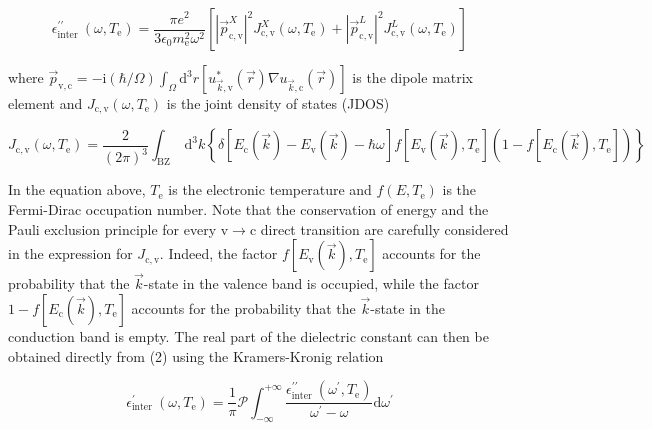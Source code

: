 \documentclass[10pt]{article}
\begin{document}
\begin{equation*}
\epsilon_{\text {inter }}^{\prime \prime}\left(\omega, T_{\mathrm{e}}\right)=\frac{\pi e^{2}}{3 \epsilon_{0} m_{\mathrm{e}}^{2} \omega^{2}}\left[\left|\vec{p}_{\mathrm{c}, \mathrm{v}}^{X}\right|^{2} J_{\mathrm{c}, \mathrm{v}}^{X}\left(\omega, T_{\mathrm{e}}\right)+\left|\vec{p}_{\mathrm{c}, \mathrm{v}}^{L}\right|^{2} J_{\mathrm{c}, \mathrm{v}}^{L}\left(\omega, T_{\mathrm{e}}\right)\right] \tag{2}
\end{equation*}


where $\vec{p}_{\mathrm{v}, \mathrm{c}}=-\mathrm{i}(\hbar / \Omega) \int_{\Omega} \mathrm{d}^{3} r\left[u_{\vec{k}, \mathrm{v}}^{*}(\vec{r}) \nabla u_{\vec{k}, \mathrm{c}}(\vec{r})\right]$ is the dipole matrix element and $J_{\mathrm{c}, \mathrm{v}}\left(\omega, T_{\mathrm{e}}\right)$ is the joint density of states (JDOS)


\begin{equation*}
J_{\mathrm{c}, \mathrm{v}}\left(\omega, T_{\mathrm{e}}\right)=\frac{2}{(2 \pi)^{3}} \int_{\mathrm{BZ}} \mathrm{~d}^{3} k\left\{\delta\left[E_{\mathrm{c}}(\vec{k})-E_{\mathrm{v}}(\vec{k})-\hbar \omega\right] f\left[E_{\mathrm{v}}(\vec{k}), T_{\mathrm{e}}\right]\left(1-f\left[E_{\mathrm{c}}(\vec{k}), T_{\mathrm{e}}\right]\right)\right\} \tag{3}
\end{equation*}


In the equation above, $T_{\mathrm{e}}$ is the electronic temperature and $f\left(E, T_{\mathrm{e}}\right)$ is the Fermi-Dirac occupation number. Note that the conservation of energy and the Pauli exclusion principle for every $\mathrm{v} \rightarrow \mathrm{c}$ direct transition are carefully considered in the expression for $J_{\mathrm{c}, \mathrm{v}}$. Indeed, the factor $f\left[E_{\mathrm{v}}(\vec{k}), T_{\mathrm{e}}\right]$ accounts for the probability that the $\vec{k}$-state in the valence band is occupied, while the factor $1-f\left[E_{\mathrm{c}}(\vec{k}), T_{\mathrm{e}}\right]$ accounts for the probability that the $\vec{k}$-state in the conduction band is empty. The real part of the dielectric constant can then be obtained directly from (2) using the Kramers-Kronig relation


\begin{equation*}
\epsilon_{\text {inter }}^{\prime}\left(\omega, T_{\mathrm{e}}\right)=\frac{1}{\pi} \mathcal{P} \int_{-\infty}^{+\infty} \frac{\epsilon_{\text {inter }}^{\prime \prime}\left(\omega^{\prime}, T_{\mathrm{e}}\right)}{\omega^{\prime}-\omega} \mathrm{d} \omega^{\prime} \tag{4}
\end{equation*}
\end{document}
